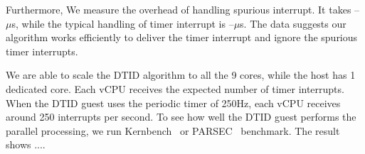 Furthermore, We measure the overhead of handling spurious
interrupt. It takes --$\mu$s, while the typical handling of
timer interrupt is --$\mu$s. The data suggests our algorithm
works efficiently to deliver the timer interrupt and ignore
the spurious timer interrupts.

We are able to scale the DTID algorithm to all the 9 cores,
while the host has 1 dedicated core. Each vCPU receives the
expected number of timer interrupts. When the DTID guest uses
the periodic timer of 250Hz, each vCPU receives around 250
interrupts per second. To see how well the DTID guest performs
the parallel processing, we run Kernbench~\cite{kernbench} or
PARSEC~\cite{bienia:2008} benchmark. The result shows ....
